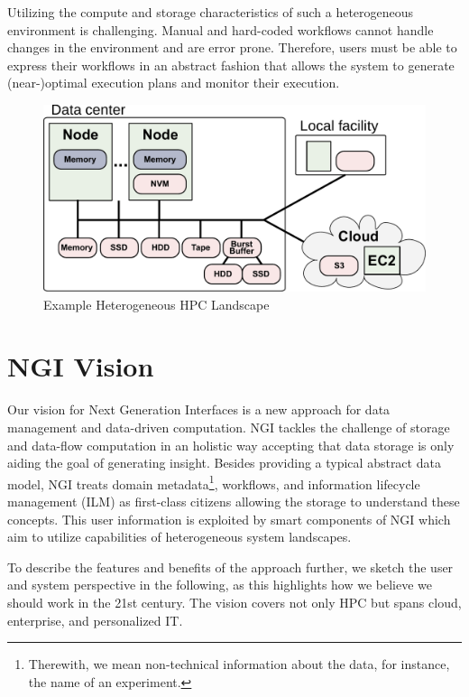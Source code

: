 \documentclass[a4paper, twocolumn]{article}
\begin{document}
Utilizing the compute and storage characteristics of such a heterogeneous environment is challenging.
Manual and hard-coded workflows cannot handle changes in the environment and are error prone.
Therefore, users must be able to express their workflows in an abstract fashion that allows the system to generate (near-)optimal execution plans and monitor their execution.


\begin{figure}[b]
  \centering
  \includegraphics[width=\columnwidth]{system}
  \caption{Example Heterogeneous HPC Landscape}
  \label{fig:heterogeneous}
\end{figure}


\section{NGI Vision}
\label{sec:ngiVision}

Our vision for Next Generation Interfaces is a new approach for data management and data-driven computation.
NGI tackles the challenge of storage and data-flow computation in an holistic way accepting that data storage is only aiding the goal of generating insight.
Besides providing a typical abstract data model, NGI treats domain metadata\footnote{Therewith, we mean non-technical information about the data, for instance, the name of an experiment.}, workflows, and information lifecycle management (ILM) as first-class citizens allowing the storage to understand these concepts.
This user information is exploited by smart components of NGI which aim to utilize capabilities of  heterogeneous system landscapes.

To describe the features and benefits of the approach further, we sketch the user and system perspective in the following, as this highlights how we believe we should work in the 21st century.
The vision covers not only HPC but spans cloud, enterprise, and personalized IT.
\end{document}
